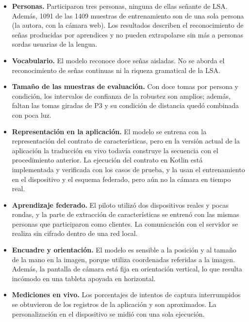\begin{itemize}
    \item \textbf{Personas.} Participaron tres personas, ninguna de ellas señante de LSA. Además, 1091 de las 1409 muestras de entrenamiento son de una sola persona (la autora, con la cámara web). Los resultados describen el reconocimiento de señas producidas por aprendices y no pueden extrapolarse sin más a personas sordas usuarias de la lengua.
    \item \textbf{Vocabulario.} El modelo reconoce doce señas aisladas. No se aborda el reconocimiento de señas continuas ni la riqueza gramatical de la LSA.
    \item \textbf{Tamaño de las muestras de evaluación.} Con doce tomas por persona y condición, los intervalos de confianza de la robustez son amplios; además, faltan las tomas giradas de P3 y su condición de distancia quedó combinada con poca luz.
    \item \textbf{Representación en la aplicación.} El modelo se entrena con la representación del contrato de características, pero en la versión actual de la aplicación la traducción en vivo todavía construye la secuencia con el procedimiento anterior. La ejecución del contrato en Kotlin está implementada y verificada con los casos de prueba, y la usan el entrenamiento en el dispositivo y el esquema federado, pero aún no la cámara en tiempo real.
    \item \textbf{Aprendizaje federado.} El piloto utilizó dos dispositivos reales y pocas rondas, y la parte de extracción de características se entrenó con las mismas personas que participaron como clientes. La comunicación con el servidor se realiza sin cifrado dentro de una red local.
    \item \textbf{Encuadre y orientación.} El modelo es sensible a la posición y al tamaño de la mano en la imagen, porque utiliza coordenadas referidas a la imagen. Además, la pantalla de cámara está fija en orientación vertical, lo que resulta incómodo en una tableta apoyada en horizontal.
    \item \textbf{Mediciones en vivo.} Los porcentajes de intentos de captura interrumpidos se obtuvieron de los registros de la aplicación y son aproximados. La personalización en el dispositivo se midió con una sola ejecución.
\end{itemize}

